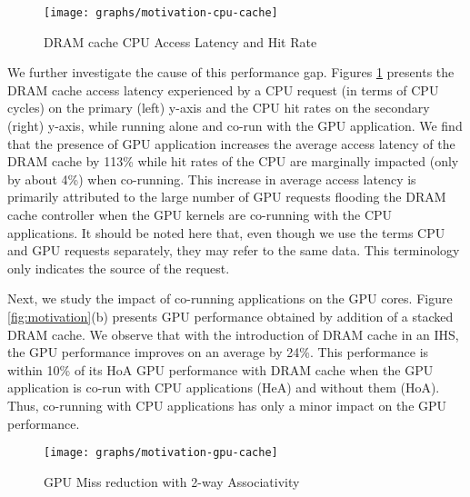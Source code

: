 \begin{figure}[htb]
	\centering
	\texttt{[image: graphs/motivation-cpu-cache]}
	\caption{DRAM cache CPU Access Latency and Hit Rate}
	\label{fig:motivation-cpu-cache}
\end{figure}

\par We further investigate the cause of this performance gap. Figures \ref{fig:motivation-cpu-cache} presents the DRAM cache access latency experienced by a CPU request (in terms of CPU cycles) on the primary (left) y-axis and the CPU hit rates on the secondary (right) y-axis, while running alone and co-run with the GPU application. We find that the presence of GPU application increases the average access latency of the DRAM cache by 113\% while hit rates of the CPU are marginally impacted (only by about 4\%) when co-running.
This increase in average access latency is primarily attributed to the large
number of GPU requests flooding the DRAM cache controller when the GPU kernels are co-running with the CPU applications.
It should be noted here that, even though we use the terms CPU and GPU requests separately, they may refer to the same data. This terminology only indicates the source of the request. 
\par Next, we study the impact of co-running applications on the GPU cores. Figure \ref{fig:motivation}(b) presents GPU performance obtained by addition of a stacked DRAM cache.
We observe that with the introduction of DRAM cache in an IHS, the GPU performance improves on an average by 24\%. This performance is within 10\% of its HoA GPU performance with DRAM cache when the GPU application is co-run with CPU applications (HeA) and without them (HoA).
Thus, co-running with CPU applications has only a minor impact on the GPU performance. 
\begin{figure}[htb]
   \centering
   \texttt{[image: graphs/motivation-gpu-cache]}
   \caption{GPU Miss reduction with 2-way Associativity}
   \label{fig:motivation-gpu-cache}
\end{figure}

